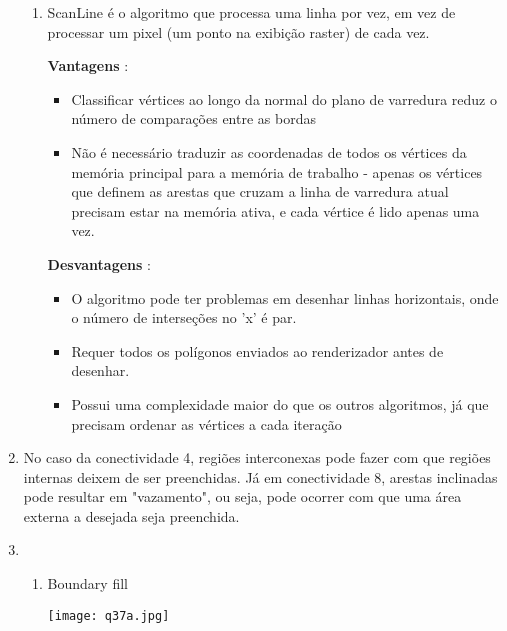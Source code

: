 \begin{enumerate}[label=\arabic*)]
\begin{enumerate}[label=\alph*.]
		\item ScanLine é o algoritmo que processa uma linha por vez, em vez de processar um pixel (um ponto na exibição raster) de cada vez.
		
		\textbf{Vantagens} : 
		\begin{itemize}
			\item Classificar vértices ao longo da normal do plano de varredura reduz o número de comparações entre as bordas
			\item Não é necessário traduzir as coordenadas de todos os vértices da memória principal para a memória de trabalho - apenas os vértices que definem as arestas que cruzam a linha de varredura atual precisam estar na memória ativa, e cada vértice é lido apenas uma vez.
		\end{itemize}
		
		\textbf{Desvantagens} : 
		
				\begin{itemize}
					\item O algoritmo pode ter problemas em desenhar linhas horizontais, onde o
					número de interseções no 'x' é par.
					\item Requer todos os polígonos enviados ao renderizador antes de desenhar.
					\item Possui uma complexidade maior do que os outros algoritmos, já que
					precisam ordenar as vértices a cada iteração
				\end{itemize}

 	\end{enumerate}
 	
 	\item  No caso da conectividade 4, regiões interconexas pode fazer com que regiões internas 
 	deixem de ser preenchidas. Já em conectividade 8, arestas inclinadas pode resultar em 
 	"vazamento", ou seja, pode ocorrer com que uma área externa a desejada seja preenchida.
 	
 	\item 
 	
 	        \begin{enumerate}[label=\alph*.]
					\setlength\itemsep{1em}
		
					\item Boundary fill 
		
 					 \begin{minipage}{\linewidth}
      						\centering
      						\texttt{[image: q37a.jpg]}
  					\end{minipage}
  					

\end{enumerate}
\end{enumerate}
